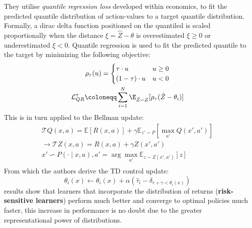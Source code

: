 They utilise \emph{quantile regression loss} developed within economics, to fit the predicted
quantile distribution of action-values to a target quantile distribution. Formally, a dirac delta
function positioned on the quantiled is scaled proportionally when the distance $\xi = \hat{Z} - \theta$ 
is overestimated $\xi \geq 0$ or underestimated $\xi < 0$. Quantile regression is used
to fit the predicted quantile to the target by minimizing the following objective:
\begin{equation}
    \begin{gathered}
        \rho_\tau(u) = \begin{cases}
            \tau \cdot u & u \geq 0 \\
            (1 - \tau) \cdot u & u < 0
        \end{cases} \\
        \mathcal{L}^\tau_{QR} \coloneqq  \sum_{i=1}^N \E_{\hat{Z} \backsim Z}[\rho_\tau(\hat{Z} -\theta_i)]
    \end{gathered}
\end{equation}
This is in turn applied to the Bellman update: 
\begin{equation}
    \begin{gathered}
        \mathcal{T}Q(x,a) = \mathbb{E}[R(x,a)] + \gamma \mathbb{E}_{z' \backsim P}[\max_{a'}Q(x',a')] \\
        \rightarrow \mathcal{T}Z(x,a) = R(x,a) + \gamma Z(x',a') \\
        x' \backsim P(\cdot \mid x,a), a' = \arg \max_{a'} \mathbb{E}_{z \backsim Z(x',a')}[z] \\
    \end{gathered}
\end{equation}
From which the authors derive the TD control update:
\begin{equation}
    \theta_i(x) \leftarrow \theta_i(x) + \alpha(\hat{\tau}_i - \delta_{r + \gamma < \theta_i(x)})
\end{equation}
\cite{Dabney2017} results show that learners that incorporate the distribution of returns (\textbf{risk-sensitive learners})
perform much better and converge to optimal policies much faster, this increase in performance is no doubt
due to the greater representational power of distributions.